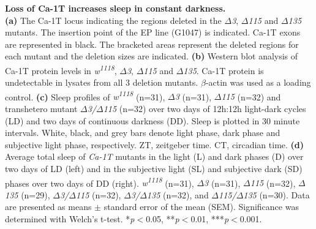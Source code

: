 \label{fig:S3}
\textbf{Loss of Ca-\alpha1T increases sleep in constant darkness.}
\\
\textbf{(a)} The Ca-\alpha1T locus indicating the regions deleted in the \emph{$\Delta$3}, \emph{$\Delta$115} and \emph{$\Delta$135} mutants.
The insertion point of the EP line (G1047) is indicated.
Ca-\alpha1T exons are represented in black.
The bracketed areas represent the deleted regions for each mutant and the deletion sizes are indicated.
\textbf{(b)} Western blot analysis of Ca-\alpha1T protein levels in \emph{w\textsuperscript{1118}}, \emph{$\Delta$3}, \emph{$\Delta$115} and \emph{$\Delta$135}.
Ca-\alpha1T protein is undetectable in lysates from all 3 deletion mutants.
$\beta$-actin was used as a loading control.
\textbf{(c)} Sleep profiles of \emph{w\textsuperscript{1118}} (n=31), \emph{$\Delta$3} (n=31), \emph{$\Delta$115} (n=32) and transhetero mutant \emph{$\Delta$3/$\Delta$115} (n=32) over two days of 12h:12h light-dark cycles (LD) and two days of continuous darkness (DD).
Sleep is plotted in 30 minute intervals.
White, black, and grey bars denote light phase, dark phase and subjective light phase, respectively.
ZT, zeitgeber time.
CT, circadian time.
\textbf{(d)} Average total sleep of \emph{Ca-\alpha1T} mutants in the light (L) and dark phases (D) over two days of LD (left) and in the subjective light (SL) and subjective dark (SD) phases over two days of DD (right).
\emph{w\textsuperscript{1118}} (n=31), \emph{$\Delta$3} (n=31), \emph{$\Delta$115} (n=32), \emph{$\Delta$135} (n=29), \emph{$\Delta$3/$\Delta$115} (n=32), \emph{$\Delta$3/$\Delta$135} (n=32), and \emph{$\Delta$115/$\Delta$135} (n=30).
Data are presented as means $\pm$ standard error of the mean (SEM).
Significance was determined with Welch's t-test.
*\emph{p}$<$0.05, **\emph{p}$<$0.01, ***\emph{p}$<$0.001.
